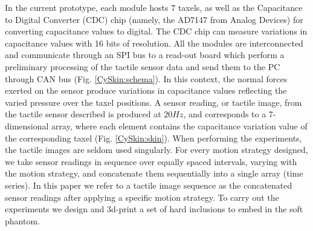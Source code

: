 \documentclass[]{interact}
\theoremstyle{plain}%
\theoremstyle{definition}
\theoremstyle{remark}
\begin{document}
In the current prototype, each module hosts $7$ taxels, as well as the Capacitance to Digital Converter (CDC) chip (namely, the AD7147 from Analog Devices) for converting capacitance values to digital. The CDC chip can measure variations in capacitance values with 16 bits of resolution. All the modules are interconnected and communicate through an SPI bus to a read-out board which perform a preliminary processing of the tactile sensor data and send them to the PC through CAN bus (Fig. \ref{CySkin:schema}). %
In this context, the normal forces exerted on the sensor produce variations in capacitance values reflecting the varied pressure over the taxel positions. A sensor reading, or tactile image, from the tactile sensor described is produced at $20Hz$, and corresponds to a 7-dimensional array, where each element contains the capacitance variation value of the corresponding taxel (Fig. \ref{CySkin:skin}).
When performing the experiments, the  tactile images are seldom used singularly. For every motion strategy designed, we take sensor readings in sequence over equally spaced intervals, varying with the motion strategy, and concatenate them sequentially into a single array (time series).
In this paper we refer to a tactile image sequence as the concatenated sensor readings after applying a specific motion strategy.
To carry out the experiments we design and 3d-print a set of hard inclusions to embed in the soft phantom.
\end{document}
